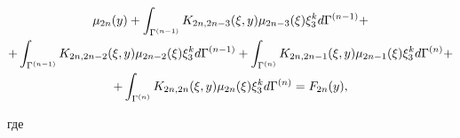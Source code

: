 \begin{gather}
\mu_{2n}(y)+\int


_{\Gamma^{(n-1)}}K_{2n,2n-3}(\xi,y)\mu_{2n-3}(\xi)\xi_3^k


d\Gamma^{(n-1)}+ \notag \\


%


+\int_{\Gamma^{(n-1)}}K_{2n,2n-2}(\xi,y)\mu_{2n-2}(\xi)\xi_3^k


d\Gamma^{(n-1)} +\int


_{\Gamma^{(n)}}K_{2n,2n-1}(\xi,y)\mu_{2n-1}(\xi)\xi_3^k


d\Gamma^{(n)}+ \notag \\


%


+\int_{\Gamma^{(n)}}K_{2n,2n}(\xi,y)\mu_{2n}(\xi)\xi_3^k


d\Gamma^{(n)}=F_{2n}(y),


\end{gather}


где


